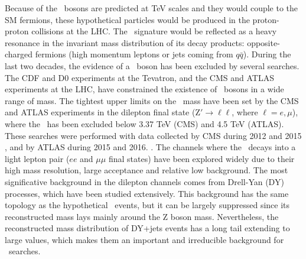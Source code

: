 
\noindent Because of the \Zprime~bosons are predicted at TeV scales and they would couple to the SM fermions, 
these hypothetical particles would be produced in the proton-proton collisions at the LHC. The 
\Zprime~signature would be reflected as a heavy resonance in the invariant mass distribution of its 
decay products: opposite-charged fermions (high momentum leptons or jets coming from $q\bar{q}$). During 
the last two decades, the evidence of a \Zprime~boson has been excluded by several searches. 
The CDF \cite{CDFZprimedielectronbib,CDFZprimedimuonbib,CDFZprimeditaubib,CDFZprimeditopbib}  
and D0 \cite{D0Zprimesearchesbib,D0Zprimetodielectronbib,D0Zprimeditopbib} experiments at the Tevatron, and
the CMS \cite{CMSZprimetodileptonrun1run2, CMSZprimetodileptonrun1, CMSZprimetodileptonrun1sqrt7, CMSZprimetotautaurun1,
CMSZprimetotautauemu, CMSZprimetotautau2015, CMSZprimeto4leptons, CMSZprimeHplusZ, CMSZprimetotoptoprun1, CMSZprimetodibjetsrun1, CMSZprimedijetrun2} and 
ATLAS \cite{ATLASZprimetodileptonrun2, ATLASZprimetodilepton2015, ATLASZprimetodilepton2012, ATLASZprimetodileptonrun1, ATLASZprimetotautau2016,
ATLASZprimetotautau2015, ATLASZprimetotautaurun1, ATLASZprimetotautau2011, ATLASZprimetojet2015, ATLASZprimetobjet2015} experiments at the LHC, have 
constrained the existence of \Zprime~bosons in a wide range of mass. The tightest upper limits on the \Zprime~mass have 
been set by the CMS and ATLAS experiments in the dilepton final state (Z$'\rightarrow \ell\ell$, where $\ell=e, \mu$), where the \ZprimeSSM~has been 
excluded below 3.37 TeV (CMS) and 4.5 TeV (ATLAS). These searches were performed
with data collected by CMS during 2012 and 2015 \cite{CMSZprimetodileptonrun1run2}, and by ATLAS 
during 2015 and 2016. \cite{ATLASZprimetodileptonrun2}. The channels
where the \Zprime~decays into a light lepton pair ($ee$ and $\mu\mu$ final states) have been explored
widely due to their high mass resolution, large acceptance and relative low background. The most significative 
background in the dilepton channels comes from Drell-Yan (DY) processes, which have been studied extensively. This 
background has the same topology as the hypothetical \Zprime~events, but it can be largely 
suppressed since its reconstructed mass lays mainly around the Z boson mass. Nevertheless, the 
reconstructed mass distribution of DY+jets events has a long tail extending to large values, which 
makes them an important and irreducible background for \Zprime~searches.  \\

